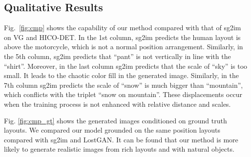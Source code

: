 \subsection{Qualitative Results}
Fig.~\ref{fig:cmp} shows the capability of our method compared with that of sg2im on VG and HICO-DET. 
In the 1st column, sg2im predicts the human layout is above the motorcycle, which is not a normal position arrangement. Similarly, in the 5th column, sg2im predicts that ``pant'' is not vertically in line with the ``shirt''. Moreover, in the last column sg2im predicts that the scale of ``sky'' is too small.
It leads to the chaotic color fill in the generated image. Similarly, in the 7th column sg2im predicts the scale of ``snow'' is much bigger than ``mountain'', which conflicts with the triplet ``snow on mountain''. These displacements occur when the training process is not enhanced with relative distance and scales. 

Fig. \ref{fig:cmp_gt} shows the generated images conditioned on ground truth layouts. We compared our model grounded on the same position layouts compared with sg2im and LostGAN. It can be found that our method is more likely to generate realistic images from rich layouts and with natural objects. 

